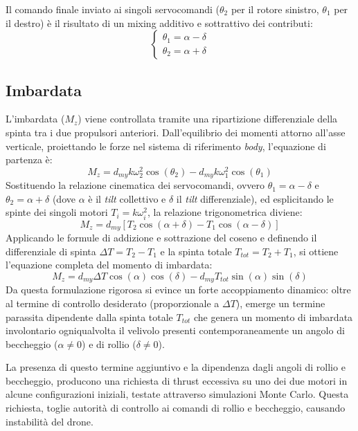 Il comando finale inviato ai singoli servocomandi ($\theta_2$ per il rotore sinistro, $\theta_1$ per il destro) è il risultato di un mixing additivo e sottrattivo dei contributi:
\begin{equation}
    \begin{cases}
        \theta_{1} = \alpha - \delta \\
        \theta_{2} = \alpha + \delta
    \end{cases}
\end{equation}

\subsection{Imbardata}
L'imbardata ($M_z$) viene controllata tramite una ripartizione differenziale della spinta tra i due propulsori anteriori. Dall'equilibrio dei momenti attorno all'asse verticale, proiettando le forze nel sistema di riferimento \textit{body}, l'equazione di partenza è:
\begin{equation}
    M_z = d_{my} k \omega_2^2 \cos(\theta_2) - d_{my} k \omega_1^2 \cos(\theta_1)
\end{equation}
Sostituendo la relazione cinematica dei servocomandi, ovvero $\theta_1 = \alpha - \delta$ e $\theta_2 = \alpha + \delta$ (dove $\alpha$ è il \textit{tilt} collettivo e $\delta$ il \textit{tilt} differenziale), ed esplicitando le spinte dei singoli motori $T_i = k \omega_i^2$, la relazione trigonometrica diviene:
\begin{equation}
    M_z = d_{my} \left[ T_2 \cos(\alpha + \delta) - T_1 \cos(\alpha - \delta) \right]
\end{equation}
Applicando le formule di addizione e sottrazione del coseno e definendo il differenziale di spinta $\Delta T = T_2 - T_1$ e la spinta totale $T_{tot} = T_2 + T_1$, si ottiene l'equazione completa del momento di imbardata:
\begin{equation}
    M_z = d_{my} \Delta T \cos(\alpha) \cos(\delta) - d_{my} T_{tot} \sin(\alpha) \sin(\delta)
\end{equation}
Da questa formulazione rigorosa si evince un forte accoppiamento dinamico: oltre al termine di controllo desiderato (proporzionale a $\Delta T$), emerge un termine parassita dipendente dalla spinta totale $T_{tot}$ che genera un momento di imbardata involontario ogniqualvolta il velivolo presenti contemporaneamente un angolo di beccheggio ($\alpha \neq 0$) e di rollio ($\delta \neq 0$).

La presenza di questo termine aggiuntivo e la dipendenza dagli angoli di rollio e beccheggio, producono una richiesta di thrust eccessiva su uno dei due motori in alcune configurazioni iniziali, testate attraverso simulazioni Monte Carlo. 
Questa richiesta, toglie autorità di controllo ai comandi di rollio e beccheggio, causando instabilità del drone. 

